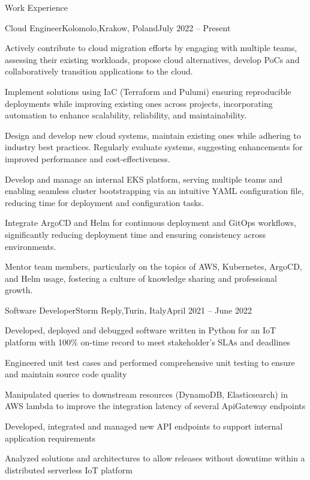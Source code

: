 \documentclass[a4paper]{article}
\newlength{\tabin}
\newlength{\secsep}
\newcommand{\lineunder}{\vspace*{-8pt}\\\hspace*{-6pt}\hrulefill\\\vspace*{-15pt}}
\newenvironment{tabbedsection}[1]{
  \begin{list}{}{
    \setlength{\itemsep}{0pt}
    \setlength{\labelsep}{0pt}
    \setlength{\labelwidth}{0pt}
    \setlength{\leftmargin}{\tabin}
    \setlength{\rightmargin}{\tabin}
    \setlength{\listparindent}{0pt}
    \setlength{\parsep}{0pt}
    \setlength{\parskip}{0pt}
    \setlength{\partopsep}{0pt}
    \setlength{\topsep}{#1}
  }
  \item[]
}{\end{list}}
\newenvironment{resume_section}[1]{
  \filbreak
  \vspace{2\secsep}
  \textsc{\large#1}
  \lineunder
  \begin{tabbedsection}{\secsep}
}{\end{tabbedsection}}
\newenvironment{subitems}{
  \renewcommand{\labelitemi}{-}
  \begin{itemize}
  \setlength{\labelsep}{1em}
}{\end{itemize}}
\newenvironment{resume_employer}[4]{
  \vspace{\secsep}
  \textbf{#1 \hfill #4} \\ 
  \textit{\small #2 #3}
  \begin{tabbedsection}{0pt}
  \begin{subitems}
}{\end{subitems}\end{tabbedsection}}
\begin{document}
\begin{resume_section}{Work Experience}
  \begin{resume_employer}{Cloud Engineer}{Kolomolo,}{Krakow, Poland}{July 2022 -- Present}
    \item Actively contribute to cloud migration efforts by engaging with multiple teams, assessing their existing workloads, propose cloud alternatives, develop PoCs and collaboratively transition applications to the cloud.
    \item Implement solutions using IaC (Terraform and Pulumi) ensuring reproducible deployments while improving existing ones across projects, incorporating automation to enhance scalability, reliability, and maintainability.
    \item Design and develop new cloud systems, maintain existing ones while adhering to industry best practices. Regularly evaluate systems, suggesting enhancements for improved performance and cost-effectiveness.
    \item Develop and manage an internal EKS platform, serving multiple teams and enabling seamless cluster bootstrapping via an intuitive YAML configuration file, reducing time for deployment and configuration tasks.
    \item Integrate ArgoCD and Helm for continuous deployment and GitOps workflows, significantly reducing deployment time and ensuring consistency across environments.
    \item Mentor team members, particularly on the topics of AWS, Kubernetes, ArgoCD, and Helm usage, fostering a culture of knowledge sharing and professional growth.
  \end{resume_employer}

  \begin{resume_employer}{Software Developer}{Storm Reply,}{Turin, Italy}{April 2021 -- June 2022}
    \item Developed, deployed and debugged software written in Python for an IoT platform with 100\% on-time record to meet stakeholder's SLAs and deadlines
    \item Engineered unit test cases and performed comprehensive unit testing to ensure and maintain source code quality
    \item Manipulated queries to downstream resources (DynamoDB, Elasticsearch) in AWS lambda to improve the integration latency of several ApiGateway endpoints
    \item Developed, integrated and managed new API endpoints to support internal application requirements
    \item Analyzed solutions and architectures to allow releases without downtime within a distributed serverless IoT platform
  \end{resume_employer}


\end{resume_section}
\end{document}

